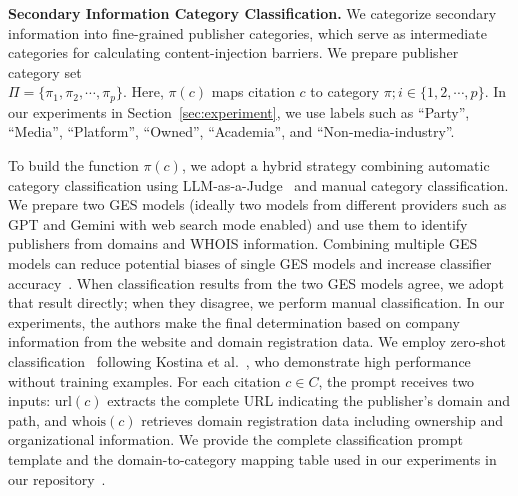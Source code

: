 \textbf{Secondary Information Category Classification.}
We categorize secondary information into fine-grained publisher categories, which serve as intermediate categories for calculating content-injection barriers.
We prepare publisher category set \\ \( \Pi = \{\pi_1, \pi_2, \cdots, \pi_p\} \). 
Here, \( \pi(c) \) maps citation \( c \) to category \( \pi; i \in \{1, 2, \cdots, p\} \).
In our experiments in Section~\ref{sec:experiment}, we use labels such as ``Party'', ``Media'', ``Platform'', ``Owned'', ``Academia'', and ``Non-media-industry''.

To build the function \( \pi(c) \), we adopt a hybrid strategy combining automatic category classification using LLM-as-a-Judge~\cite{survey-llm-as-a-judge-arxiv24,judging-llm-as-a-judge-with-mt-bench-and-chatbot-arena-arxiv23} and manual category classification.
We prepare two GES models (ideally two models from different providers such as GPT and Gemini with web search mode enabled) and use them to identify publishers from domains and WHOIS information.
Combining multiple GES models can reduce potential biases of single GES models and increase classifier accuracy~\cite{judging-llm-as-a-judge-with-mt-bench-and-chatbot-arena-arxiv23}.
When classification results from the two GES models agree, we adopt that result directly; when they disagree, we perform manual classification.
In our experiments, the authors make the final determination based on company information from the website and domain registration data.
We employ zero-shot classification~\cite{radford2019language} following Kostina et al.~\cite{kostina2025largelanguagemodelstext}, who demonstrate high performance without training examples.
For each citation \( c \in C \), the prompt receives two inputs: \( \text{url}(c) \) extracts the complete URL indicating the publisher's domain and path, and \( \text{whois}(c) \) retrieves domain registration data including ownership and organizational information.
We provide the complete classification prompt template and the domain-to-category mapping table used in our experiments in our repository~\cite{QL_CIKM_RERO}.

